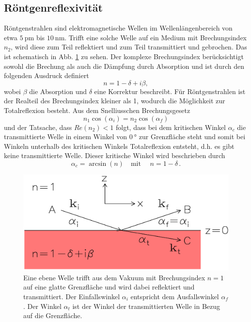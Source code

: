 \subsection{Röntgenreflexivität}
Röntgenstrahlen sind elektromagnetische Wellen im Wellenlängenbereich von etwa $\SI{5}{\pico\meter}$ bis $\SI{10}{\nano\meter}$.
Trifft eine solche Welle auf ein Medium mit Brechungsindex $n_2$, wird diese zum Teil reflektiert und zum Teil transmittiert und gebrochen. Das ist schematisch in Abb. \ref{fig:Brechungsindex} zu sehen. 
Der komplexe Brechungsindex berücksichtigt sowohl die Brechung als auch die Dämpfung durch Absorption und ist durch den folgenden Ausdruck definiert
\begin{equation*}
    n = 1 - \delta + i \beta,
\end{equation*}
wobei $\beta$ die Absorption und $\delta$ eine Korrektur beschreibt.
Für Röntgenstrahlen ist der Realteil des Brechungsindex kleiner als 1, wodurch die Möglichkeit zur Totalreflexion besteht.
Aus dem Snelliusschen Brechungsgesetz
\begin{equation*}
    n_1 \cos(\alpha_i) = n_2 \cos(\alpha_f)
\end{equation*}
und der Tatsache, dass $Re(n_2) < 1$ folgt, dass bei dem kritischen Winkel $\alpha_c$ die transmittierte Welle in einem Winkel von $\SI{0}{\degree}$ zur Grenzfläche steht und somit bei Winkeln unterhalb des kritischen Winkels Totalreflexion entsteht, d.h. es gibt keine transmittierte Welle. %
Dieser kritische Winkel wird beschrieben durch
\begin{equation}
    \alpha_c = \arcsin(n) \quad \text{mit } \quad n= 1-\delta \, .
    \label{eq:krit}
\end{equation}

\begin{figure}
    \centering
    \includegraphics[width=0.7\linewidth]{./figures/Brechungsindex.png}
    \caption{Eine ebene Welle trifft aus dem Vakuum mit Brechungsindex $n=1$ auf eine glatte Grenzfläche und wird dabei reflektiert und transmittiert. Der Einfallswinkel $\alpha_i$ entspricht dem Ausfallswinkel $\alpha_f$. Der Winkel $\alpha_t$ ist der Winkel der transmittierten Welle in Bezug auf die Grenzfläche. \cite{V44old}}
    \label{fig:Brechungsindex}
\end{figure}

